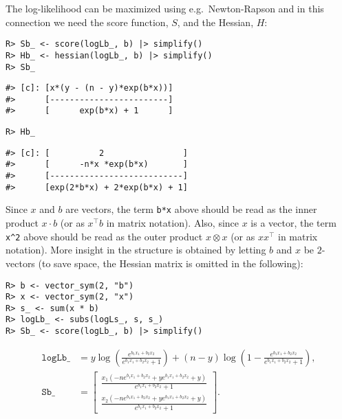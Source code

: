 The log-likelihood can be maximized using e.g.~Newton-Rapson and in this connection we
need the score function, \(S\), and the Hessian, \(H\):

\begin{verbatim}
R> Sb_ <- score(logLb_, b) |> simplify()
R> Hb_ <- hessian(logLb_, b) |> simplify()
R> Sb_
\end{verbatim}

\begin{verbatim}
#> [c]: [x*(y - (n - y)*exp(b*x))]
#>      [------------------------]
#>      [      exp(b*x) + 1      ]
\end{verbatim}

\begin{verbatim}
R> Hb_
\end{verbatim}

\begin{verbatim}
#> [c]: [          2                ]
#>      [      -n*x *exp(b*x)       ]
#>      [---------------------------]
#>      [exp(2*b*x) + 2*exp(b*x) + 1]
\end{verbatim}

Since \(x\) and \(b\) are vectors, the term \texttt{b*x} above should be read
as the inner product \(x \cdot b\) (or as \(x^\top b\) in matrix
notation). Also, since \(x\) is a vector, the term \texttt{x\^{}2} above should
be read as the outer product \(x \otimes x\) (or as \(x x^\top\) in
matrix notation). More insight in the structure is obtained by
letting \(b\) and \(x\) be \(2\)-vectors (to save space, the Hessian matrix is omitted in the following):

\begin{verbatim}
R> b <- vector_sym(2, "b")
R> x <- vector_sym(2, "x")
R> s_ <- sum(x * b)
R> logLb_ <- subs(logLs_, s, s_)
R> Sb_ <- score(logLb_, b) |> simplify()
\end{verbatim}

\begin{align}
\texttt{logLb}\_ &= y \log{\left(\frac{e^{b_{1} x_{1} + b_{2} x_{2}}}{e^{b_{1} x_{1} + b_{2} x_{2}} + 1} \right)} + \left(n - y\right) \log{\left(1 - \frac{e^{b_{1} x_{1} + b_{2} x_{2}}}{e^{b_{1} x_{1} + b_{2} x_{2}} + 1} \right)}, \\
\texttt{Sb}\_    &= \left[\begin{matrix}\frac{x_{1} \left(- n e^{b_{1} x_{1} + b_{2} x_{2}} + y e^{b_{1} x_{1} + b_{2} x_{2}} + y\right)}{e^{b_{1} x_{1} + b_{2} x_{2}} + 1}\\\frac{x_{2} \left(- n e^{b_{1} x_{1} + b_{2} x_{2}} + y e^{b_{1} x_{1} + b_{2} x_{2}} + y\right)}{e^{b_{1} x_{1} + b_{2} x_{2}} + 1}\end{matrix}\right] .
\end{align}

